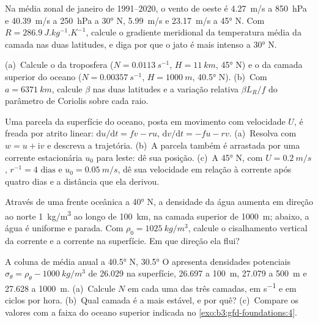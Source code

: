 \begin{exercise}[$\star\star$]\label{exo:b3:gfd-foundations:8}
Na média zonal de janeiro de 1991--2020, o vento de oeste é \qty{4.27}{m/s}
a \qty{850}{hPa} e \qty{40.39}{m/s} a \qty{250}{hPa} a \ang{30} N,
\qty{5.99}{m/s} e \qty{23.17}{m/s} a \ang{45} N. Com $R =
\qty{286.9}{J.kg^{-1}.K^{-1}}$, calcule o gradiente meridional da
temperatura média da camada nas duas latitudes, e diga por que o jato é mais intenso
a \ang{30} N.
\end{exercise}

\begin{exercise}[$\star\star$]\label{exo:b3:gfd-foundations:9}
(a)~Calcule o  da troposfera ($N =
\qty{0.0113}{s^{-1}}$, $H = \qty{11}{km}$, \ang{45} N) e o da camada superior
do oceano ($N = \qty{0.00357}{s^{-1}}$, $H = \qty{1000}{m}$, \ang{40.5} N).
(b)~Com $a = \qty{6371}{km}$, calcule $\beta$ nas duas latitudes e a
variação relativa $\beta L_R/f$ do parâmetro de Coriolis sobre cada raio.
\end{exercise}

\begin{exercise}[$\star\star\star$]\label{exo:b3:gfd-foundations:10}
Uma parcela da superfície do oceano, posta em movimento com velocidade $U$, é freada
por atrito linear: $\mathrm du/\mathrm dt = fv - ru$, $\mathrm dv/\mathrm dt = -fu -
rv$. (a)~Resolva com $w = u + \mathrm iv$ e descreva a trajetória. (b)~A
parcela também é arrastada por uma corrente estacionária $u_0$ para leste: dê sua
posição. (c)~A \ang{45} N, com $U = \qty{0.2}{m/s}$, $r^{-1} =
\num{4}\text{ dias}$ e $u_0 = \qty{0.05}{m/s}$, dê sua velocidade em relação à
corrente após quatro dias e a distância que ela derivou.
\end{exercise}

\begin{exercise}[$\star\star\star$]\label{exo:b3:gfd-foundations:11}
Através de uma frente oceânica a \ang{40} N, a densidade da água aumenta
em direção ao norte \qty{1}{kg/m^3} ao longo de \qty{100}{km}, na camada superior
de \qty{1000}{m}; abaixo, a água é uniforme e parada. Com $\rho_0 =
\qty{1025}{kg/m^3}$, calcule o cisalhamento vertical da corrente e a
corrente na superfície. Em que direção ela flui?
\end{exercise}

\begin{exercise}[$\star\star\star$]\label{exo:b3:gfd-foundations:12}
A coluna de média anual a \ang{40.5} N, \ang{30.5} O apresenta densidades potenciais
$\sigma_\theta = \rho_\theta - \qty{1000}{kg/m^3}$ de 26.029 na
superfície, 26.697 a \qty{100}{m}, 27.079 a \qty{500}{m} e 27.628 a
\qty{1000}{m}. (a)~Calcule $N$ em cada uma das três camadas, em
\unit{s^{-1}} e em ciclos por hora. (b)~Qual camada é a mais estável,
e por quê? (c)~Compare os valores com a faixa do oceano superior indicada
no \cref{exo:b3:gfd-foundations:4}.
\end{exercise}


